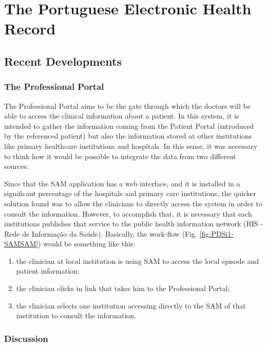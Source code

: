 \section{The Portuguese Electronic Health Record}

\subsection{Recent Developments}

\subsubsection{The Professional Portal}
The Professional Portal aims to be the gate through which the doctors will be able to access the clinical information about a patient. In this system, it is intended to gather the information coming from the Patient Portal (introduced by the referenced patient) but also the information stored at other institutions like primary healthcare institutions and hospitals. In this sense, it was necessary to think how it would be possible to integrate the data from two different sources:

Since that the SAM application has a web interface, and it is installed in a significant percentage of the hospitals and primary care institutions, the quicker solution found was to allow the clinicians to directly access the system in order to consult the information. However, to accomplish that, it is necessary that each institutions publishes that service to the public health information network (RIS - Rede de Informação da Saúde). Basically, the work-flow (Fig. \ref{fig:PDSi1-SAMSAM}) would be something like this:
\begin{enumerate}
\item the clinician at local institution is using SAM to access the local episode and patient information;
\item the clinician clicks in link that takes him to the Professional Portal;
\item the clinician selects one institution accessing directly to the SAM of that institution to consult the information.
\end{enumerate}


\subsubsection{Discussion}

